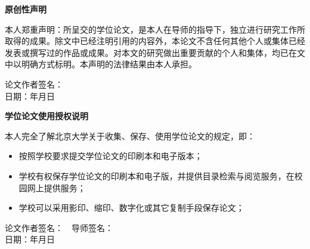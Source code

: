 \begin{center}
    \textbf{原创性声明}
\end{center}

本人郑重声明：所呈交的学位论文，是本人在导师的指导下，独立进行研究工作所取得的成果。除文中已经注明引用的内容外，本论文不含任何其他个人或集体已经发表或撰写过的作品或成果。对本文的研究做出重要贡献的个人和集体，均已在文中以明确方式标明。本声明的法律结果由本人承担。

\bigskip

\begin{flushright}
    论文作者签名：\hspace{10em}　\\
    \vspace{1em}
    日期：\hspace{4em}年\hspace{2em}月\hspace{2em}日
\end{flushright}

\bigskip
\bigskip

\begin{center}
    \textbf{学位论文使用授权说明}
\end{center}

本人完全了解北京大学关于收集、保存、使用学位论文的规定，即：
\begin{itemize}
    \item 按照学校要求提交学位论文的印刷本和电子版本；
    \item 学校有权保存学位论文的印刷本和电子版，并提供目录检索与阅览服务，在校园网上提供服务；
    \item 学校可以采用影印、缩印、数字化或其它复制手段保存论文；
\end{itemize}

\bigskip

\begin{flushright}
    论文作者签名：\hspace{5em}　导师签名：\hspace{5em}　\\
    \vspace{1em}
    日期：\hspace{4em}年\hspace{2em}月\hspace{2em}日\hspace{5em}　
\end{flushright}